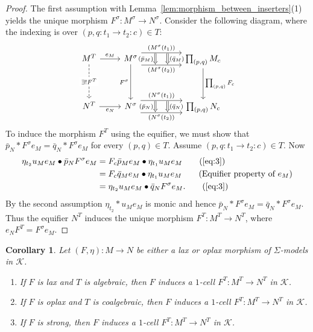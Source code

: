 \documentclass[11pt]{article}
\theoremstyle{plain}
\newtheorem{corollary}[theorem]{Corollary}
\theoremstyle{definition}
\numberwithin{equation}{section}
\newcommand{\K}{\mathcal{K}}
\begin{document}
\begin{proof}
   The first assumption with Lemma~\ref{lem:morphism_between_inserters}(1) yields the unique morphism $F^\sigma\colon M^\sigma\to N^\sigma$. Consider the following diagram, where the indexing is over $(p,q\colon t_1\to t_2\colon c)\in T$:
   $$ 
\begin{tikzcd}[ampersand replacement=\&]
 {M^T} \& {M^\sigma} \&\& {\prod_{(p,q)} M_c} \\
 \\
 {N^T} \& {N^\sigma} \&\& {\prod_{(p,q)} N_c}
 \arrow["{{{{e_M}}}}", from=1-1, to=1-2]
 \arrow["{{\exists! F^T}}"{description}, dashed, from=1-1, to=3-1]
 \arrow[""{name=0, anchor=center, inner sep=0}, "{{{{(M^\sigma(t_1))}}}}", shift left=3, from=1-2, to=1-4]
 \arrow[""{name=1, anchor=center, inner sep=0}, "{{{{(M^\sigma(t_2))}}}}"', shift right=3, from=1-2, to=1-4]
 \arrow["{{{F^\sigma}}}"', from=1-2, to=3-2]
 \arrow["{{{\prod_{(p,q)}F_c}}}", from=1-4, to=3-4]
 \arrow["{{e_N}}"', from=3-1, to=3-2]
 \arrow[""{name=2, anchor=center, inner sep=0}, "{{{{(N^\sigma(t_1))}}}}", shift left=3, from=3-2, to=3-4]
 \arrow[""{name=3, anchor=center, inner sep=0}, "{{{{(N^\sigma(t_2))}}}}"', shift right=3, from=3-2, to=3-4]
 \arrow["{{{{(\bar{p}_M)}}}}"', shift right=3, Rightarrow, from=0, to=1]
 \arrow["{{{{(\bar{q}_M)}}}}", shift left=3, Rightarrow, from=0, to=1]
 \arrow["{{{{(\bar{q}_N)}}}}", shift left=3, Rightarrow, from=2, to=3]
 \arrow["{{{{(\bar{p}_N)}}}}"', shift right=3, Rightarrow, from=2, to=3]
\end{tikzcd}
$$
   To induce the morphism $F^T$ using the equifier, we must show that $\bar{p}_N*F^\sigma e_M = \bar{q}_N*F^\sigma e_M$ for every $(p,q)\in T$. Assume $(p,q\colon t_1\to t_2\colon c)\in T$. Now
   \begin{align*}
       \eta_{t_2}u_Me_M\bullet \bar{p}_NF^\sigma e_M
       &= F_c\bar{p}_Me_M\bullet \eta_{t_1}u_Me_M \tag{\eqref{eq:3}}\\
       &= F_c\bar{q}_Me_M\bullet \eta_{t_1}u_Me_M \tag{Equifier property of $e_M$}\\
       &= \eta_{t_2}u_Me_M\bullet \bar{q}_NF^\sigma e_M. \tag{\eqref{eq:3}}
   \end{align*}
   By the second assumption $\eta_{t_2}*u_Me_M$ is monic and hence $\bar{p}_N*F^\sigma e_M = \bar{q}_N*F^\sigma e_M$. Thus the equifier $N^T$ induces the unique morphism $F^T\colon M^T\to N^T$, where $e_NF^T = F^\sigma e_M$. 
\end{proof}
\begin{corollary}
   Let $(F,\eta) \colon M \to N$ be either a lax or oplax morphism of $\Sigma$-models in $\K$. 
   \begin{enumerate}
       \item If $F$ is lax and $T$ is algebraic, then $F$ induces a $1$-cell $F^T \colon M^T \to N^T$ in $\K$.
       \item If $F$ is oplax and $T$ is coalgebraic, then $F$ induces a $1$-cell $F^T \colon M^T \to N^T$ in $\K$.
       \item If $F$ is strong, then $F$ induces a $1$-cell $F^T \colon M^T \to N^T$ in $\K$.
   \end{enumerate}
\end{corollary}
\end{document}
